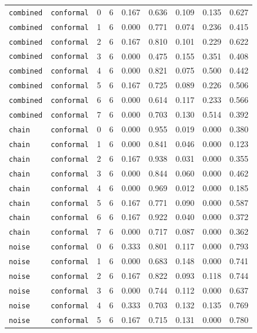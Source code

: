 \documentclass{article}
\begin{document}
\begin{center}
\begin{tabular}{lllcccccc}
\texttt{combined} & \texttt{conformal} & 0 & 6 & 0.167 & 0.636 & 0.109 & 0.135 & 0.627 \\
\texttt{combined} & \texttt{conformal} & 1 & 6 & 0.000 & 0.771 & 0.074 & 0.236 & 0.415 \\
\texttt{combined} & \texttt{conformal} & 2 & 6 & 0.167 & 0.810 & 0.101 & 0.229 & 0.622 \\
\texttt{combined} & \texttt{conformal} & 3 & 6 & 0.000 & 0.475 & 0.155 & 0.351 & 0.408 \\
\texttt{combined} & \texttt{conformal} & 4 & 6 & 0.000 & 0.821 & 0.075 & 0.500 & 0.442 \\
\texttt{combined} & \texttt{conformal} & 5 & 6 & 0.167 & 0.725 & 0.089 & 0.226 & 0.506 \\
\texttt{combined} & \texttt{conformal} & 6 & 6 & 0.000 & 0.614 & 0.117 & 0.233 & 0.566 \\
\texttt{combined} & \texttt{conformal} & 7 & 6 & 0.000 & 0.703 & 0.130 & 0.514 & 0.392 \\
\texttt{chain} & \texttt{conformal} & 0 & 6 & 0.000 & 0.955 & 0.019 & 0.000 & 0.380 \\
\texttt{chain} & \texttt{conformal} & 1 & 6 & 0.000 & 0.841 & 0.046 & 0.000 & 0.123 \\
\texttt{chain} & \texttt{conformal} & 2 & 6 & 0.167 & 0.938 & 0.031 & 0.000 & 0.355 \\
\texttt{chain} & \texttt{conformal} & 3 & 6 & 0.000 & 0.844 & 0.060 & 0.000 & 0.462 \\
\texttt{chain} & \texttt{conformal} & 4 & 6 & 0.000 & 0.969 & 0.012 & 0.000 & 0.185 \\
\texttt{chain} & \texttt{conformal} & 5 & 6 & 0.167 & 0.771 & 0.090 & 0.000 & 0.587 \\
\texttt{chain} & \texttt{conformal} & 6 & 6 & 0.167 & 0.922 & 0.040 & 0.000 & 0.372 \\
\texttt{chain} & \texttt{conformal} & 7 & 6 & 0.000 & 0.717 & 0.087 & 0.000 & 0.362 \\
\texttt{noise} & \texttt{conformal} & 0 & 6 & 0.333 & 0.801 & 0.117 & 0.000 & 0.793 \\
\texttt{noise} & \texttt{conformal} & 1 & 6 & 0.000 & 0.683 & 0.148 & 0.000 & 0.741 \\
\texttt{noise} & \texttt{conformal} & 2 & 6 & 0.167 & 0.822 & 0.093 & 0.118 & 0.744 \\
\texttt{noise} & \texttt{conformal} & 3 & 6 & 0.000 & 0.744 & 0.112 & 0.000 & 0.637 \\
\texttt{noise} & \texttt{conformal} & 4 & 6 & 0.333 & 0.703 & 0.132 & 0.135 & 0.769 \\
\texttt{noise} & \texttt{conformal} & 5 & 6 & 0.167 & 0.715 & 0.131 & 0.000 & 0.780 \\
\bottomrule
\end{tabular}
\end{center}
\end{document}
